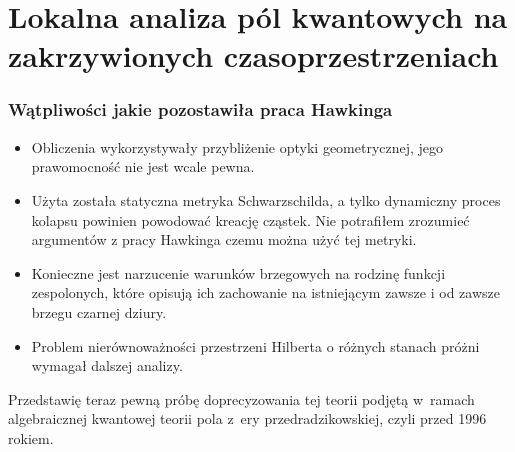 \documentclass[10pt,t]{beamer}
\begin{document}
\section{Lokalna analiza pól kwantowych na zakrzywionych
  czasoprzestrzeniach}



\begin{frame}
  \frametitle{Wątpliwości jakie pozostawiła praca Hawkinga}


  \begin{itemize}
    \RaggedRight

  \item Obliczenia wykorzystywały przybliżenie optyki geometrycznej,
    jego prawomocność nie jest wcale pewna.

  \item Użyta została statyczna metryka Schwarzschilda, a tylko
    dynamiczny proces kolapsu powinien powodować kreację cząstek. Nie
    potrafiłem zrozumieć argumentów z pracy Hawkinga czemu można użyć
    tej metryki.

  \item Konieczne jest narzucenie warunków brzegowych na rodzinę
    funkcji zespolonych, które opisują ich zachowanie na istniejącym
    zawsze i od zawsze brzegu czarnej dziury.

  \item Problem nierównoważności przestrzeni Hilberta o różnych
    stanach próżni wymagał dalszej analizy.

  \end{itemize}


  Przedstawię teraz pewną próbę doprecyzowania tej teorii podjętą w~ramach
  algebraicznej kwantowej teorii pola z~ery przedradzikowskiej,
  czyli przed 1996 rokiem.

\end{frame}
\end{document}
